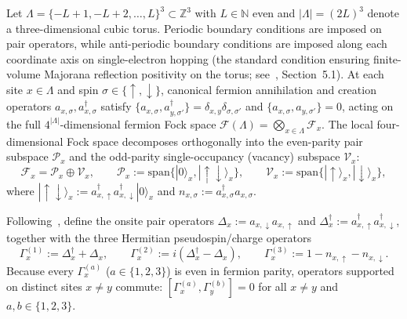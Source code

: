 \documentclass[11pt]{article}
\theoremstyle{definition}
\theoremstyle{remark}
\newcommand{\calF}{\mathcal{F}}
\newcommand{\calP}{\mathcal{P}}
\newcommand{\calV}{\mathcal{V}}
\newcommand{\bbZ}{\mathbb{Z}}
\newcommand{\bbN}{\mathbb{N}}
\begin{document}
Let $\Lambda = \{-L+1, -L+2, \dots, L\}^3 \subset \bbZ^3$ with $L \in \bbN$ even and $|\Lambda| = (2L)^3$ denote a three-dimensional cubic torus. Periodic boundary conditions are imposed on pair operators, while anti-periodic boundary conditions are imposed along each coordinate axis on single-electron hopping (the standard condition ensuring finite-volume Majorana reflection positivity on the torus; see~\cite{koma2022}, Section~5.1). At each site $x \in \Lambda$ and spin $\sigma \in \{\uparrow, \downarrow\}$, canonical fermion annihilation and creation operators $a_{x,\sigma}, a_{x,\sigma}^\dagger$ satisfy $\{a_{x,\sigma}, a_{y,\sigma'}^\dagger\} = \delta_{x,y}\delta_{\sigma,\sigma'}$ and $\{a_{x,\sigma}, a_{y,\sigma'}\} = 0$, acting on the full $4^{|\Lambda|}$-dimensional fermion Fock space $\calF(\Lambda) = \bigotimes_{x \in \Lambda} \calF_x$. The local four-dimensional Fock space decomposes orthogonally into the even-parity pair subspace $\calP_x$ and the odd-parity single-occupancy (vacancy) subspace $\calV_x$:
\begin{equation}\label{eq:local-fock}
\calF_x = \calP_x \oplus \calV_x, \qquad \calP_x := \mathrm{span}\{|0\rangle_x, |\uparrow\downarrow\rangle_x\}, \qquad \calV_x := \mathrm{span}\{|\uparrow\rangle_x, |\downarrow\rangle_x\},
\end{equation}
where $|\uparrow\downarrow\rangle_x := a_{x,\uparrow}^\dagger a_{x,\downarrow}^\dagger |0\rangle_x$ and $n_{x,\sigma} := a_{x,\sigma}^\dagger a_{x,\sigma}$.

Following~\cite{koma2022}, define the onsite pair operators $\Delta_x := a_{x,\downarrow} a_{x,\uparrow}$ and $\Delta_x^\dagger := a_{x,\uparrow}^\dagger a_{x,\downarrow}^\dagger$, together with the three Hermitian pseudospin/charge operators
\begin{equation}\label{eq:gamma-def}
\Gamma_x^{(1)} := \Delta_x^\dagger + \Delta_x, \qquad \Gamma_x^{(2)} := i(\Delta_x^\dagger - \Delta_x), \qquad \Gamma_x^{(3)} := 1 - n_{x,\uparrow} - n_{x,\downarrow}.
\end{equation}
Because every $\Gamma_x^{(a)}$ ($a \in \{1,2,3\}$) is even in fermion parity, operators supported on distinct sites $x \ne y$ commute: $[\Gamma_x^{(a)}, \Gamma_y^{(b)}] = 0$ for all $x \ne y$ and $a,b \in \{1,2,3\}$.
\end{document}
